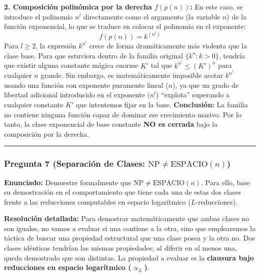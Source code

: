 \documentclass[12pt]{book} %
\begin{document}
\textbf{2. Composición polinómica por la derecha \(f(p(n))\):} En este
caso, se introduce el polinomio \(n^l\) directamente como el argumento
(la variable \(n\)) de la función exponencial, lo que se traduce en
colocar el polinomio en el exponente: \[f(p(n)) = k^{(n^l)}\] Para
\(l \ge 2\), la expresión \(k^{n^l}\) crece de forma dramáticamente más
violenta que la clase base. Para que estuviera dentro de la familia
original \(\{k^n : k > 0\}\), tendría que existir alguna constante
mágica enorme \(K'\) tal que \(k^{n^l} \le (K')^n\) para cualquier \(n\)
grande. Sin embargo, es matemáticamente imposible acotar \(k^{n^l}\)
usando una función con exponente puramente lineal (\(n\)), ya que un
grado de libertad adicional introducido en el exponente (\(n^l\))
``explota'' superando a cualquier constante \(K'\) que intentemos fijar
en la base. \textbf{Conclusión:} La familia no contiene ninguna función
capaz de dominar ese crecimiento masivo. Por lo tanto, la clase
exponencial de base constante \textbf{NO es cerrada} bajo la composición
por la derecha.

\begin{center}\rule{0.5\linewidth}{0.5pt}\end{center}

\hypertarget{pregunta-7-separaciuxf3n-de-clases-textnp-neq-textespacion}{%
\subsubsection{\texorpdfstring{Pregunta 7 (Separación de Clases:
\(\text{NP} \neq \text{ESPACIO}(n)\))}{Pregunta 7 (Separación de Clases: \textbackslash text\{NP\} \textbackslash neq \textbackslash text\{ESPACIO\}(n))}}\label{pregunta-7-separaciuxf3n-de-clases-textnp-neq-textespacion}}

\textbf{Enunciado:} Demuestre formalmente que
\(\text{NP} \neq \text{ESPACIO}(n)\). Para ello, base su demostración en
el comportamiento que tiene cada una de estas dos clases frente a las
reducciones computables en espacio logarítmico (\(L\)-reducciones).

\textbf{Resolución detallada:} Para demostrar matemáticamente que ambas
clases no son iguales, no vamos a evaluar si una contiene a la otra,
sino que emplearemos la táctica de buscar una propiedad estructural que
una clase posea y la otra no. Dos clases idénticas tendrían las mismas
propiedades; al diferir en al menos una, queda demostrado que son
distintas. La propiedad a evaluar es la \textbf{clausura bajo
reducciones en espacio logarítmico (\(\propto_L\))}.
\end{document}
